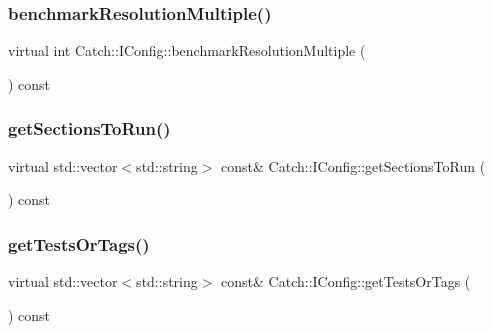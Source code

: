 \mbox{\label{struct_catch_1_1_i_config_a775f740b8af9df931e87db51dfdc6033}} 
\subsubsection{benchmarkResolutionMultiple()}
{\footnotesize\ttfamily virtual int Catch\+::\+I\+Config\+::benchmark\+Resolution\+Multiple (\begin{DoxyParamCaption}{ }\end{DoxyParamCaption}) const\hspace{0.3cm}{\ttfamily [pure virtual]}}

\mbox{\label{struct_catch_1_1_i_config_afc801995e115557f90e41f3d6e96908d}} 
\subsubsection{getSectionsToRun()}
{\footnotesize\ttfamily virtual std\+::vector$<$std\+::string$>$ const\& Catch\+::\+I\+Config\+::get\+Sections\+To\+Run (\begin{DoxyParamCaption}{ }\end{DoxyParamCaption}) const\hspace{0.3cm}{\ttfamily [pure virtual]}}

\mbox{\label{struct_catch_1_1_i_config_a1b8a299344a493eb98c12faae48421d7}} 
\subsubsection{getTestsOrTags()}
{\footnotesize\ttfamily virtual std\+::vector$<$std\+::string$>$ const\& Catch\+::\+I\+Config\+::get\+Tests\+Or\+Tags (\begin{DoxyParamCaption}{ }\end{DoxyParamCaption}) const\hspace{0.3cm}{\ttfamily [pure virtual]}}

\mbox{\label{struct_catch_1_1_i_config_a49a475bbeb3180c06799d6d958914649}} 
